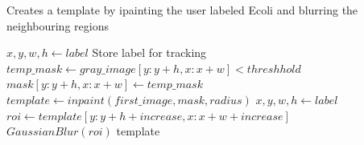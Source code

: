\documentclass{article}
\begin{document}
\begin{algorithm}
    \caption{Creates a template by ipainting the user labeled Ecoli
    and blurring the neighbouring regions}
    \label{alg:template}
    \renewcommand{\thealgorithm}{}
    \begin{algorithmic}[1]
            \State $x, y, w, h \gets \mathit{label}$
            \State Store label for tracking
            \State $\mathit{temp\_mask} \gets \mathit{gray\_image}[y:y + h, x:x + w] < \mathit{threshhold}$ 
            \State $\textit{mask}[y:y + h, x:x + w] \gets \mathit{temp\_mask}$
        \EndFor
        \State $\textit{template} \gets \mathit{inpaint(first\_image, mask, radius)}$
            \State $x, y, w, h \gets \mathit{label}$
            \State $\mathit{roi} \gets \mathit{template[y:y+h+increase, x:x+w+increase]}$\\
            \State $\mathit{GaussianBlur(roi)}$
        \EndFor
        \State \Return template
\end{algorithmic}\end{algorithm}
\end{document}
